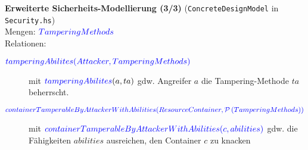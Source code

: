 \documentclass[varwidth=18cm]{standalone}
\begin{document}
\textbf{Erweiterte Sicherheits-Modellierung (3/3)} (\texttt{ConcreteDesignModel} in \texttt{Security.hs})\\

Mengen: ${\color{blue}{TamperingMethods}}$ \\

Relationen:
\begin{description}
  \item[${\color{blue}{tamperingAbilites(Attacker, TamperingMethods)}}$]
        mit ${\color{blue}{tamperingAbilites}}(a, ta)$ gdw. Angreifer $a$ die
        Tampering-Methode $ta$ beherrscht.

  \item[${\color{blue}{containerTamperableByAttackerWithAbilities(ResourceContainer,
        \mathcal{P}\left(TamperingMethods\right))}}$]
        mit ${\color{blue}{containerTamperableByAttackerWithAbilities(c, abilities)}}$ gdw. die Fähigkeiten $abilities$ ausreichen, den Container $c$ zu knacken
\end{description}
\end{document}
